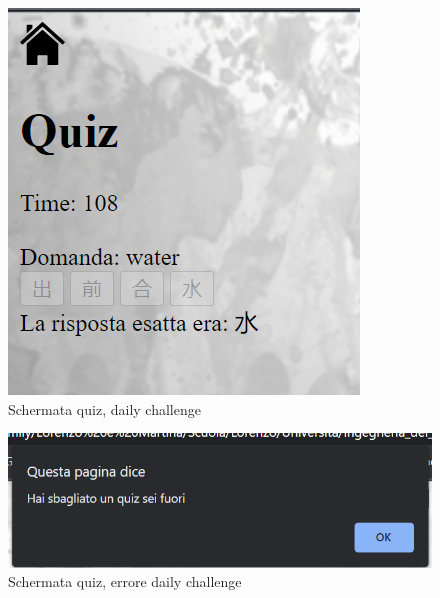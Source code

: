 \begin{figure}[!h]
\centering
\includegraphics[scale=0.70]{images/dailyChallengeCorretta.png}
\caption{Schermata quiz, daily challenge}
\label{fig:user_flow_guest}
\end{figure}
\noindent


\begin{figure}[!h]
\centering
\includegraphics[scale=0.70]{images/dailyChallengeErrore.png}
\caption{Schermata quiz, errore daily challenge}
\label{fig:user_flow_guest}
\end{figure}
\noindent


